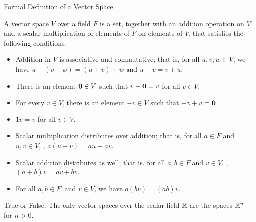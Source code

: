 \begin{edXshowhide}{Formal Definition of a Vector Space}


A vector space $V$ over a field $F$ is a set, together with an addition operation on $V$
and a scalar multiplication of elements of $F$ on elements of $V$, that satisfies
the following conditions:

\begin{itemize}
\item Addition in $V$ is associative and commutative; that is, for all $u,v,w \in V$, we have
$u+(v+w) = (u+v)+w$ and $u+v  = v+u$.  
\item There is an element $\mathbf{0} \in V$ such that $v+\mathbf{0} = v$ for all $v \in V$.
\item For every $v\in V$, there is an element $-v \in V$ such that $-v + v = \mathbf{0}$.  
\item $1v = v$ for all $v \in V$.  
\item Scalar multiplication distributes over addition; that is, for all $a \in F$ and $u,v \in V$, , $a(u+v) = au + av$.  
\item Scalar addition distributes as well; that is, for all $a,b \in F$ and $v \in V$, , $(a+b)v = av + bv$.  
\item For all $a,b \in F$, and $v\in V$, we have $a(bv) = (ab)v$.  
\end{itemize}

\end{edXshowhide}




\endedxtext



True or False: The only vector spaces over the scalar field $\mathbb R$ are the spaces
$\mathbb R^n$ for $n> 0$.  



\endedxproblem


\endedxvertical

